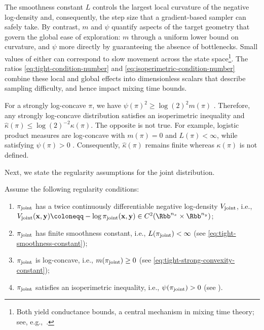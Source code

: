 \documentclass[onefignum,onetabnum]{siamonline250211}
\newcommand{\isocond}{\hat\kappa}
\newcommand{\bfx}{{\bf x}}
\newcommand{\bfy}{{\bf y}}
\newcommand{\nx}{{n_{x}}}
\newcommand{\ny}{{n_{y}}}
\newcommand{\pjoint}{\pi_{\rm joint}}
\begin{document}
%
The smoothness constant $L$ controls the largest local curvature of the negative log-density and, consequently, the step size that a gradient-based sampler can safely take.
%
%
By contrast, $m$ and $\psi$ quantify aspects of the target geometry that govern the global ease of exploration: $m$ through a uniform lower bound on curvature, and $\psi$ more directly by guaranteeing the absence of bottlenecks. 
Small values of either can correspond to slow movement across the state space\footnote{Both yield conductance bounds, a central mechanism in mixing time theory; see, e.g.,~\cite[Section 3.1.1]{wu_minimax_2022}.}.
The ratios \eqref{eq:tight-condition-number} and \eqref{eq:isoperimetric-condition-number} combine these local and global effects into dimensionless scalars that describe sampling difficulty, and hence impact mixing time bounds.

%
%
%
%
%
%
%
%
%
\begin{remark}
  For a strongly log-concave $\pi$, we have $\psi(\pi)^2 \geq \log(2)^2 m(\pi)$ \cite[Theorem 4.4]{cousins_cubic_2014}.
  Therefore, any strongly log-concave distribution satisfies an isoperimetric inequality and $\isocond(\pi) \leq \log(2)^{-2} \kappa(\pi)$.
  The opposite is not true.
  For example, logistic product measures are log-concave with $m(\pi)=0$ and $L(\pi)<\infty$, while satisfying $\psi(\pi) > 0$ \cite[Section~4.2 and Theorem~4.5]{barthe_isoperimetry_2013}.
  Consequently, $\isocond(\pi)$ remains finite whereas $\kappa(\pi)$ is not defined.
\end{remark}

%
Next, we state the regularity assumptions for the joint distribution.
\begin{assumption}
  \label{assump:joint_density_regularity}
  Assume the following regularity conditions:
  \begin{enumerate}[leftmargin=*, label={\bfseries (A\arabic*)}]
    \item %
    $\pjoint$ has a twice continuously differentiable negative log-density $V_{\rm joint}$, i.e.,\\
    $V_{\rm joint}(\bfx,\bfy)\coloneqq -\log\pjoint(\bfx,\bfy)\in C^2(\Rbb^\nx \times \Rbb^\ny)$;
\label{assump:continuously_differentiable}
    \item $\pjoint$ has finite smoothness constant, i.e., $L(\pjoint) < \infty$ (see \eqref{eq:tight-smoothness-constant});\label{assump:L_smooth}
    \item $\pjoint$ is log-concave, i.e., $m(\pjoint) \geq 0$ (see \eqref{eq:tight-strong-convexity-constant});\label{assump:log_concave}
    \item $\pjoint$ satisfies an isoperimetric inequality, i.e., $\psi(\pjoint) > 0$ (see ).\label{assump:isoperimetric}
  \end{enumerate}
\end{assumption}
\end{document}
